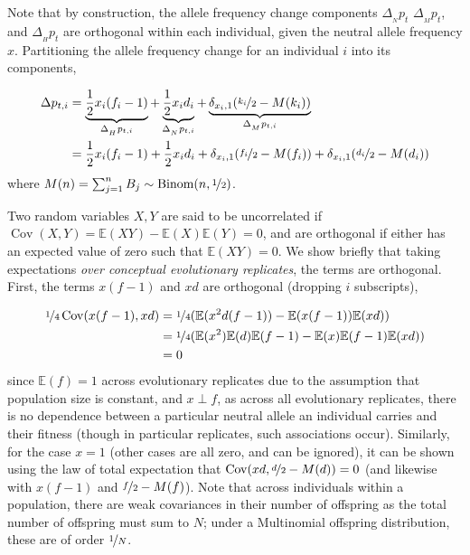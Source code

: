 \documentclass[11pt]{article}
\newcommand{\E}{\mathbb{E}}
\DeclareMathOperator{\cov}{Cov}
\begin{document}
Note that by construction, the allele frequency change components $\Delta_{_N}
p_t$ $\Delta_{_M} p_t$, and $\Delta_{_H} p_t$ are orthogonal within each
individual, given the neutral allele frequency $x$. Partitioning the allele
frequency change for an individual $i$ into its components,

\begin{align}
  \Delta p_{t,i} &= \underbrace{\frac{1}{2} x_i (f_i - 1)}_{\Delta_{_H} p_{t,i}} + 
       \underbrace{\frac{1}{2} x_i d_i}_{\Delta_{_N} p_{t,i}} + 
       \underbrace{\delta_{x_i,1}(\nicefrac{k_i}{2} - M(k_i))}_{\Delta_{_M} p_{t,i}} \\
       &= \frac{1}{2} x_i (f_i - 1) + 
       \frac{1}{2} x_i d_i + 
       \delta_{x_i,1}(\nicefrac{f_i}{2} - M(f_i)) + 
       \delta_{x_i,1}(\nicefrac{d_i}{2} - M(d_i))
\end{align}
%
where $M(n) = \sum_{j=1}^{n} B_j \sim \text{Binom}(n, \nicefrac{1}{2})$.

Two random variables $X, Y$ are said to be uncorrelated if $\cov(X, Y) = \E(XY)
- \E(X)\E(Y)= 0$, and are orthogonal if either has an expected value of zero
such that $\E(XY) = 0$. We show briefly that taking expectations \emph{over
conceptual evolutionary replicates}, the terms are orthogonal. First, the terms
$x(f-1)$ and $x d$ are orthogonal (dropping $i$ subscripts),

\begin{align}
  \nicefrac{1}{4} \cov(x(f-1), x d) &= \nicefrac{1}{4}(\E(x^2 d (f-1)) - \E(x(f-1)) \E(x d)) \nonumber \\
                                    &= \nicefrac{1}{4} (\E(x^2) \E(d) \E(f-1) - \E(x)\E(f-1) \E(x d)) \nonumber \\
                                    &= 0
\end{align}
%
since $\E(f) = 1$ across evolutionary replicates due to the assumption that
population size is constant, and $x \perp f$, as across all evolutionary
replicates, there is no dependence between a particular neutral allele an
individual carries and their fitness (though in particular replicates, such
associations occur). Similarly, for the case $x=1$ (other cases are all zero,
and can be ignored), it can be shown using the law of total expectation that
$\cov(x d, \nicefrac{d}{2} - M(d)) = 0$ (and likewise with $x (f-1)$ and
$\nicefrac{f}{2} - M(f)$). Note that across individuals within a population,
there are weak covariances in their number of offspring as the total number of
offspring must sum to $N$; under a Multinomial offspring distribution, these
are of order $\nicefrac{1}{N}$.
\end{document}
